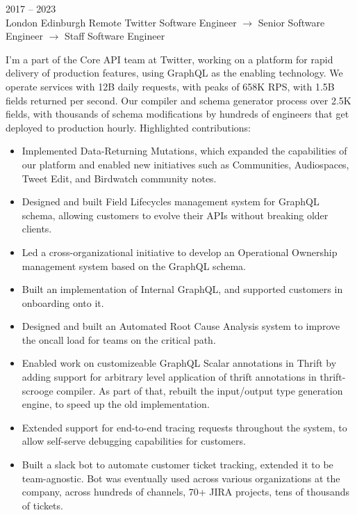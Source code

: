 \documentclass[9pt]{developercv} %
\begin{document}
\begin{entrylist}
	\entry
		{2017 -- 2023\\\footnotesize{London \newline Edinburgh \newline Remote}}
		{Twitter}
		{Software Engineer $\rightarrow$ Senior Software Engineer $\rightarrow$ Staff Software Engineer}
		{
			I'm a part of the Core API team at Twitter, working on a platform for rapid delivery of production features, using GraphQL as the enabling technology. We operate services with 12B daily requests, with peaks of 658K RPS, with 1.5B fields returned per second. Our compiler and schema generator process over 2.5K fields, with thousands of schema modifications by hundreds of engineers that get deployed to production hourly.\newline\newline
			Highlighted contributions:\newline\newline
			\begin{itemize}
				\item Implemented Data-Returning Mutations, which expanded the capabilities of our platform and enabled new initiatives such as Communities, Audiospaces, Tweet Edit, and Birdwatch community notes.
				\item Designed and built Field Lifecycles management system for GraphQL schema, allowing customers to evolve their APIs without breaking older clients.
				\item Led a cross-organizational initiative to develop an Operational Ownership management system based on the GraphQL schema.
				\item Built an implementation of Internal GraphQL, and supported customers in onboarding onto it.
				\item Designed and built an Automated Root Cause Analysis system to improve the oncall load for teams on the critical path.
				\item Enabled work on customizeable GraphQL Scalar annotations in Thrift by adding support for arbitrary level application of thrift annotations in thrift-scrooge compiler. As part of that, rebuilt the input/output type generation engine, to speed up the old implementation.
				\item Extended support for end-to-end tracing requests throughout the system, to allow self-serve debugging capabilities for customers.
				\item Built a slack bot to automate customer ticket tracking, extended it to be team-agnostic. Bot was eventually used across various organizations at the company, across hundreds of channels, 70+ JIRA projects, tens of thousands of tickets.

\end{itemize}}
\end{entrylist}
\end{document}
